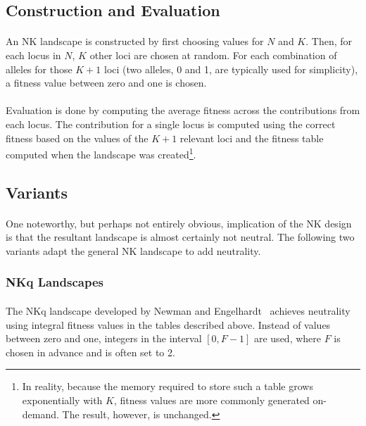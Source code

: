 \documentclass[12pt,letterpaper,titlepage]{article}
\begin{document}
\subsection{Construction and Evaluation}

\paragraph{}
An NK landscape is constructed by first choosing values for $N$ and $K$. Then,
for each locus in $N$, $K$ other loci are chosen at random. For each
combination of alleles for those $K+1$ loci (two alleles, 0 and 1, are
typically used for simplicity), a fitness value between zero and one is chosen.

\paragraph{}
Evaluation is done by computing the average fitness across the contributions
from each locus. The contribution for a single locus is computed using the
correct fitness based on the values of the $K+1$ relevant loci and the fitness
table computed when the landscape was created\footnote{In reality, because the
memory required to store such a table grows exponentially with $K$, fitness
values are more commonly generated on-demand. The result, however, is
unchanged.}.

\subsection{Variants}

\paragraph{}
One noteworthy, but perhaps not entirely obvious, implication of the NK design
is that the resultant landscape is almost certainly not neutral. The following
two variants adapt the general NK landscape to add neutrality.

\subsubsection{NKq Landscapes}

\paragraph{}
The NKq landscape developed by Newman and Engelhardt~\cite{Newman1998} achieves
neutrality using integral fitness values in the tables described above. Instead
of values between zero and one, integers in the interval $\left[0,F-1\right]$
are used, where $F$ is chosen in advance and is often set to 2.
\end{document}
